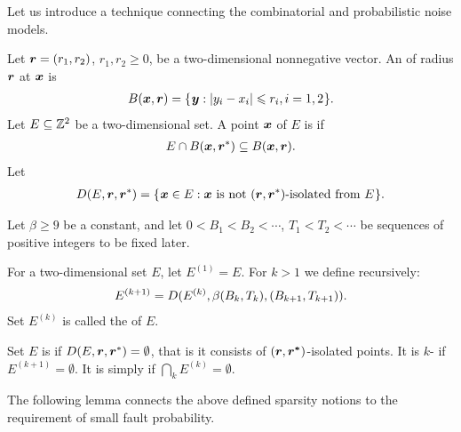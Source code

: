 \documentclass[12pt]{memoir}
\renewcommand{\B}{B}
\newcommand{\Tu}{T}
\begin{document}
Let us introduce a technique connecting the combinatorial and probabilistic
noise models.

\begin{definition}
Let $\boldsymbol{r}=(r_1,r_2)$, $r_1, r_2\ge 0$,
be a two-dimensional nonnegative vector.
An  of radius $\boldsymbol{r}$  at $\boldsymbol{x}$ is
\begin{align}\label{eq:ball1}
  B(\boldsymbol{x},\boldsymbol{r}) = \mathopen\{\mskip 1mu\boldsymbol{y} : |y_i - x_i| \leqslant r_i, i=1,2\mskip 1mu\mathclose\}.
\end{align}  
Let \( E\subseteq \mathbb{Z}^{2} \) be a two-dimensional set.
A point $\boldsymbol{x}$ of \( E \) is  if
\begin{align*}
  E \cap B(\boldsymbol{x},\boldsymbol{r}^*)\subseteq B(\boldsymbol{x}, \boldsymbol{r}).
 \end{align*}
  Let
\begin{align}
  D(E,\boldsymbol{r}, \boldsymbol{r}^*) =
     \mathopen\{\mskip 1mu\boldsymbol{x}\in E : \boldsymbol{x} \text{\rmfamily\mdseries\upshape{ is not }} (\boldsymbol{r}, \boldsymbol{r}^*)\text{\rmfamily\mdseries\upshape{-isolated
  from }} E\mskip 1mu\mathclose\}.
\end{align}
\end{definition}

\begin{definition}[Sparsity]
Let \( \beta\ge 9 \) be a constant, and let 
\( 0<\B_{1}<\B_{2}<\dotsm \), \( \Tu_{1}<\Tu_{2}<\dotsm \) be 
sequences of positive integers to be fixed later.

For a two-dimensional set \( E \), let $E^{(1)} = E$.
For $k>1$ we define recursively:
\begin{align}\label{eq:noise^k}
    E^{(k+1)} = D(E^{(k)}, \beta\pair{\B_k}{\Tu_{k}}, \pair{\B_{k+1}}{\Tu_{k+1}}).
\end{align}
Set $E^{(k)}$ is called the  of $E$.

Set $E$ is  
if $D(E, \boldsymbol{r}, \boldsymbol{r}^*)=\emptyset$, that is 
it consists of $(\boldsymbol{r}, \boldsymbol{r^*})$-isolated points.
It is \( k \)- if $E^{(k+1)}=\emptyset$.
It is simply  if \( \bigcap_{k}E^{(k)}=\emptyset \).
\end{definition}

The following lemma connects the above defined sparsity notions to the requirement
of small fault probability.
\end{document}

